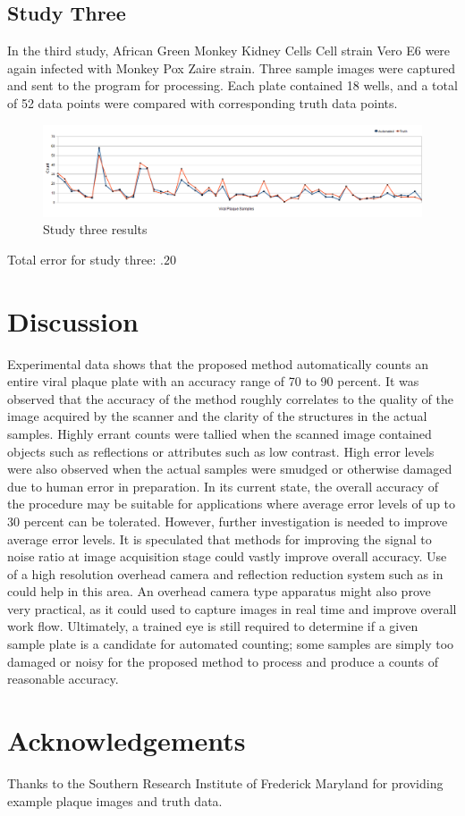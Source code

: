 \documentclass[11pt,final,twocolumn]{IEEEtran}
\begin{document}
\subsection{Study Three}
In the third study, African Green Monkey Kidney Cells  Cell strain Vero E6 were again infected with Monkey Pox Zaire strain. Three sample images were captured and sent to the program for processing. Each plate contained 18 wells, and a total of 52 data points were compared with corresponding truth data points.
\begin{figure}[H]
\centering
\includegraphics[width=.4\textwidth]{Study3Results.png}
\caption{Study three results}
\label{fig:study3Results}
\end{figure}
Total error for study three: $.20$ 


\section{Discussion}
Experimental data shows that the proposed method automatically counts an entire viral plaque plate with an accuracy range of 70 to 90 percent. It was observed that the accuracy of the method roughly correlates to the quality of the image acquired by the scanner and the clarity of the structures in the actual samples. Highly errant counts were tallied when the scanned image contained objects such as reflections or attributes such as low contrast. High error levels were also observed when the actual samples were smudged or otherwise damaged due to human error in preparation. In its current state, the overall accuracy of the procedure may be suitable for applications where average error levels of up to 30 percent can be tolerated. However, further investigation is needed to improve average error levels. It is speculated that methods for improving the signal to noise ratio at image acquisition stage could vastly improve overall accuracy. Use of a high resolution overhead camera and reflection reduction system such as in ~\cite{watershed} could help in this area. An overhead camera type apparatus might also prove very practical, as it could used to capture images in real time and improve overall work flow. Ultimately, a trained eye is still required to determine if a given sample plate is a candidate for automated counting; some samples are simply too damaged or noisy for the proposed method to process and produce a counts of reasonable accuracy.  




\appendix

\section{Acknowledgements}
Thanks to the Southern Research Institute of Frederick Maryland for providing example plaque images and truth data.
\end{document}
